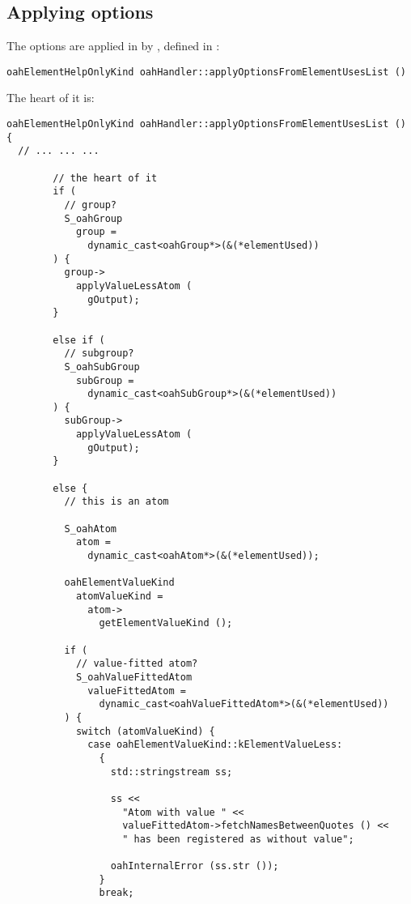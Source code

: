 {%
	\subsection{Applying options}

The options are applied in  by , defined in :
\begin{lstlisting}[language=CPlusPlus]
oahElementHelpOnlyKind oahHandler::applyOptionsFromElementUsesList ()
\end{lstlisting}

The heart of it is:
\begin{lstlisting}[language=CPlusPlus]
oahElementHelpOnlyKind oahHandler::applyOptionsFromElementUsesList ()
{
  // ... ... ...

        // the heart of it
        if (
          // group?
          S_oahGroup
            group =
              dynamic_cast<oahGroup*>(&(*elementUsed))
        ) {
          group->
            applyValueLessAtom (
              gOutput);
        }

        else if (
          // subgroup?
          S_oahSubGroup
            subGroup =
              dynamic_cast<oahSubGroup*>(&(*elementUsed))
        ) {
          subGroup->
            applyValueLessAtom (
              gOutput);
        }

        else {
          // this is an atom

          S_oahAtom
            atom =
              dynamic_cast<oahAtom*>(&(*elementUsed));

          oahElementValueKind
            atomValueKind =
              atom->
                getElementValueKind ();

          if (
            // value-fitted atom?
            S_oahValueFittedAtom
              valueFittedAtom =
                dynamic_cast<oahValueFittedAtom*>(&(*elementUsed))
          ) {
            switch (atomValueKind) {
              case oahElementValueKind::kElementValueLess:
                {
                  std::stringstream ss;

                  ss <<
                    "Atom with value " <<
                    valueFittedAtom->fetchNamesBetweenQuotes () <<
                    " has been registered as without value";

                  oahInternalError (ss.str ());
                }
                break;


\end{lstlisting}}
